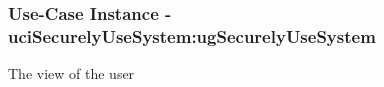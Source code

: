 
	\subsubsection{Use-Case Instance - uciSecurelyUseSystem:ugSecurelyUseSystem}
	
	The view of the user		  
	\begin{operationmodel}
	
	\end{operationmodel} 

	

